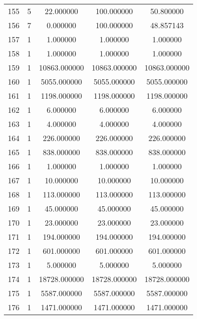 \documentclass[a4paper,12pt]{article}
\begin{document}
\begin{center}
\begin{longtable}{l S[table-format=3.0] S[table-format=8.2] S[table-format=8.2] S[table-format=8.2]}
        155   &   5   &   22.000000   &    100.000000     &      50.800000 \\
        156   &   7   &    0.000000   &    100.000000     &      48.857143 \\
        157   &   1   &    1.000000   &      1.000000     &       1.000000 \\
        158   &   1   &    1.000000   &      1.000000     &       1.000000 \\
        159   &   1   & 10863.000000   &  10863.000000     &    10863.000000 \\
        160   &   1   &  5055.000000   &   5055.000000     &     5055.000000 \\
        161   &   1   &  1198.000000   &   1198.000000     &     1198.000000 \\
        162   &   1   &     6.000000   &      6.000000     &       6.000000 \\
        163   &   1   &     4.000000   &      4.000000     &       4.000000 \\
        164   &   1   &   226.000000   &    226.000000     &     226.000000 \\
        165   &   1   &   838.000000   &    838.000000     &     838.000000 \\
        166   &   1   &     1.000000   &      1.000000     &       1.000000 \\
        167   &   1   &    10.000000   &     10.000000     &      10.000000 \\
        168   &   1   &   113.000000   &    113.000000     &     113.000000 \\
        169   &   1   &    45.000000   &     45.000000     &      45.000000 \\
        170   &   1   &    23.000000   &     23.000000     &      23.000000 \\
        171   &   1   &   194.000000   &    194.000000     &     194.000000 \\
        172   &   1   &   601.000000   &    601.000000     &     601.000000 \\
        173   &   1   &     5.000000   &      5.000000     &       5.000000 \\
        174   &   1   & 18728.000000   &  18728.000000     &   18728.000000 \\
        175   &   1   &  5587.000000   &   5587.000000     &    5587.000000 \\
        176   &   1   &  1471.000000   &   1471.000000     &    1471.000000 \\

\end{longtable}
\end{center}
\end{document}
